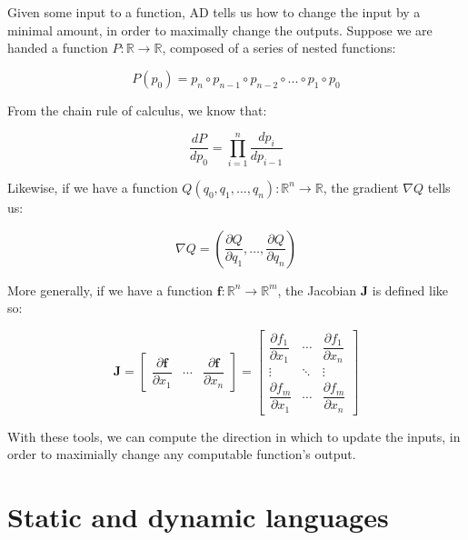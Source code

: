 \documentclass[12pt,initial,twoside,maitrise]{dms}
\numberwithin{equation}{section}
\numberwithin{table}{chapter}
\numberwithin{figure}{chapter}
\begin{document}
Given some input to a function, AD tells us how to change the input by a minimal amount, in order to maximally change the outputs. Suppose we are handed a function $P: \mathbb{R}\rightarrow\mathbb{R}$, composed of a series of nested functions:

%
\begin{equation}
    P(p_0)=p_n \circ p_{n-1} \circ p_{n-2} \circ ... \circ p_1 \circ p_0
\end{equation}
%

\noindent From the chain rule of calculus, we know that:

%
\begin{equation}
    \frac{dP}{dp_0} = {\displaystyle \prod_{i=1}^{n} \frac{dp_{i}}{dp_{i-1}}}
\end{equation}

\noindent Likewise, if we have a function $Q(q_0, q_1, \dots, q_n):  \mathbb{R}^n\rightarrow\mathbb{R}$, the gradient $\nabla Q$ tells us:

\begin{equation}
    \nabla Q = \left( \frac{\partial Q}{\partial q_1}, \dots, \frac{\partial Q}{\partial q_n}\right)
\end{equation}

\noindent More generally, if we have a function $\mathbf{f}:  \mathbb{R}^n\rightarrow\mathbb{R}^m$, the Jacobian $\mathbf J$ is defined like so:

\begin{equation}
\mathbf J = \begin{bmatrix}
                       \dfrac{\partial \mathbf{f}}{\partial x_1} & \cdots & \dfrac{\partial \mathbf{f}}{\partial x_n} \end{bmatrix}
= \begin{bmatrix}
      \dfrac{\partial f_1}{\partial x_1} & \cdots & \dfrac{\partial f_1}{\partial x_n}\\
      \vdots & \ddots & \vdots\\
      \dfrac{\partial f_m}{\partial x_1} & \cdots & \dfrac{\partial f_m}{\partial x_n} \end{bmatrix}
\end{equation}

\noindent With these tools, we can compute the direction in which to update the inputs, in order to maximially change any computable function's output.

\section{Static and dynamic languages}
\end{document}
